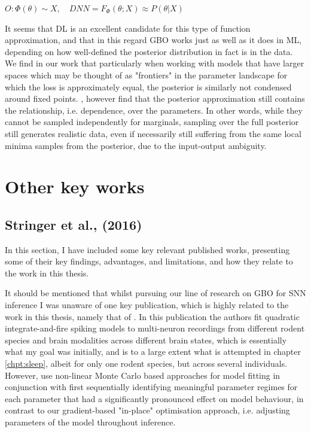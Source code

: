 \documentclass[mphil,deptreport,ianc]{infthesis} %
\begin{document}
\begin{math}
    O: \Phi(\theta) \sim X, \quad
    DNN = F_\Phi(\theta; X) \approx P(\theta|X)
\end{math}

It seems that DL is an excellent candidate for this type of function approximation, and that in this regard GBO works just as well as it does in ML, depending on how well-defined the posterior distribution in fact is in the data.
We find in our work that particularly when working with models that have larger spaces which may be thought of as "frontiers" in the parameter landscape for which the loss is approximately equal, the posterior is similarly not condensed around fixed points.
\cite{Lueckmann2021}, however find that the posterior approximation still contains the relationship, i.e. dependence, over the parameters. %
In other words, while they cannot be sampled independently for marginals, sampling over the full posterior still generates realistic data, even if necessarily still suffering from the same local minima samples from the posterior, due to the input-output ambiguity.


\section{Other key works}\label{sect:key_works}


\subsection{Stringer et al., (2016)}
In this section, I have included some key relevant published works, presenting some of their key findings, advantages, and limitations, and how they relate to the work in this thesis.

It should be mentioned that whilst pursuing our line of research on GBO for SNN inference I was unaware of one key publication, which is highly related to the work in this thesis, namely that of \cite{Stringer2016InhibitoryNetworks}.
In this publication the authors fit quadratic integrate-and-fire spiking models to multi-neuron recordings from different rodent species and brain modalities across different brain states, which is essentially what my goal was initially, and is to a large extent what is attempted in chapter \ref{chpt:sleep}, albeit for only one rodent species, but across several individuals.
However, \cite{Stringer2016InhibitoryNetworks} use non-linear Monte Carlo based approaches for model fitting in conjunction with first sequentially identifying meaningful parameter regimes for each parameter that had a significantly pronounced effect on model behaviour, in contrast to our gradient-based "in-place" optimisation approach, i.e. adjusting parameters of the model throughout inference.
\end{document}
